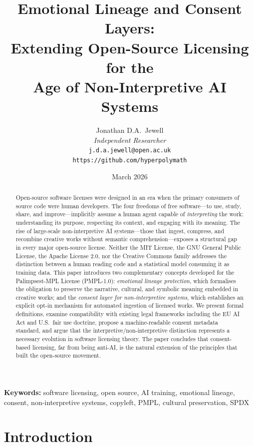 \documentclass[11pt,twocolumn]{article}
\title{%
    \textbf{Emotional Lineage and Consent Layers:\\
    Extending Open-Source Licensing for the\\
    Age of Non-Interpretive AI Systems}
}
\author{%
    Jonathan D.A.\ Jewell\\
    \textit{Independent Researcher}\\
    \texttt{j.d.a.jewell@open.ac.uk}\\
    \texttt{https://github.com/hyperpolymath}
}
\date{March 2026}
\begin{document}
\maketitle

\begin{abstract}
Open-source software licenses were designed in an era when the primary
consumers of source code were human developers. The four freedoms of free
software---to use, study, share, and improve---implicitly assume a human
agent capable of \emph{interpreting} the work: understanding its purpose,
respecting its context, and engaging with its meaning. The rise of
large-scale non-interpretive AI systems---those that ingest, compress, and
recombine creative works without semantic comprehension---exposes a
structural gap in every major open-source license. Neither the MIT License,
the GNU General Public License, the Apache License 2.0, nor the Creative
Commons family addresses the distinction between a human reading code and
a statistical model consuming it as training data. This paper introduces
two complementary concepts developed for the Palimpsest-MPL License
(PMPL-1.0): \emph{emotional lineage protection}, which formalises the
obligation to preserve the narrative, cultural, and symbolic meaning
embedded in creative works; and the \emph{consent layer for
non-interpretive systems}, which establishes an explicit opt-in mechanism
for automated ingestion of licensed works. We present formal definitions,
examine compatibility with existing legal frameworks including the EU AI
Act and U.S.\ fair use doctrine, propose a machine-readable consent
metadata standard, and argue that the interpretive/non-interpretive
distinction represents a necessary evolution in software licensing theory.
The paper concludes that consent-based licensing, far from being anti-AI,
is the natural extension of the principles that built the open-source
movement.
\end{abstract}

\medskip
\noindent\textbf{Keywords:} software licensing, open source, AI training,
emotional lineage, consent, non-interpretive systems, copyleft, PMPL,
cultural preservation, SPDX

\section{Introduction}
\label{sec:introduction}
\end{document}
